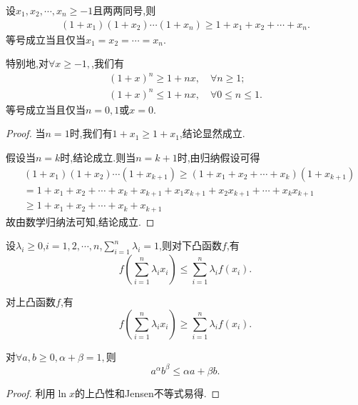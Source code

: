\documentclass[../../main.tex]{subfiles}%
\begin{document}
\begin{theorem}[Bernoulli不等式]\label{theorem:Bernoulli不等式}
设$x_1,x_2,\cdots,x_n\geqslant  -1$且两两同号,则
\begin{align*}
\left( 1+x_1 \right) \left( 1+x_2 \right) \cdots \left( 1+x_n \right) \geqslant 1+x_1+x_2+\cdots +x_n.
\end{align*}
等号成立当且仅当$x_1=x_2=\cdots =x_n$.

特别地,对$\forall x\geqslant -1,$,我们有
\begin{gather*}
(1+x)^n\geqslant1+nx,\quad \forall n\geqslant 1;
\\
(1+x)^n\leqslant1+nx,\quad \forall 0\leqslant n\leqslant 1.
\end{gather*}
等号成立当且仅当$n=0,1$或$x=0$.
\end{theorem}
\begin{proof}

当$n=1$时,我们有$1+x_1\geqslant  1+x_1$,结论显然成立.

假设当$n=k$时,结论成立.则当$n=k+1$时,由归纳假设可得
\begin{align*}
&\left( 1+x_1 \right) \left( 1+x_2 \right) \cdots \left( 1+x_{k+1} \right) \geqslant \left( 1+x_1+x_2+\cdots +x_k \right) \left( 1+x_{k+1} \right) 
\\
&=1+x_1+x_2+\cdots +x_k+x_{k+1}+x_1x_{k+1}+x_2x_{k+1}+\cdots +x_kx_{k+1}
\\
&\geqslant 1+x_1+x_2+\cdots +x_k+x_{k+1}
\end{align*}
故由数学归纳法可知,结论成立.

\end{proof}

\begin{theorem}[Jensen不等式]\label{theorem:Jensen不等式}
设\(\lambda_i \geqslant  0\),\(i = 1,2,\cdots,n\),\(\sum\limits_{i = 1}^{n} \lambda_i = 1\),则对下凸函数\(f\),有
\[
f\left(\sum\limits_{i = 1}^{n} \lambda_i x_i\right) \leqslant  \sum\limits_{i = 1}^{n} \lambda_i f(x_i).
\]

对上凸函数\(f\),有
\[
f\left(\sum\limits_{i = 1}^{n} \lambda_i x_i\right) \geqslant  \sum\limits_{i = 1}^{n} \lambda_i f(x_i).
\]
\end{theorem}

\begin{corollary}
对$\forall a,b\geqslant 0,\alpha +\beta =1,$则
$$a^{\alpha}b^{\beta}\leqslant \alpha a+\beta b.$$
\end{corollary}
\begin{proof}

利用$\ln x$的上凸性和Jensen不等式易得.

\end{proof}
\end{document}
